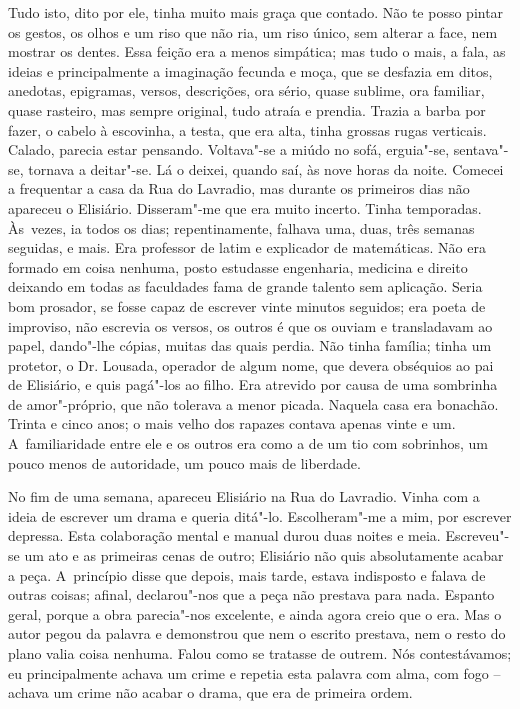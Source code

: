 Tudo isto, dito por ele, tinha muito mais graça que contado. Não te
posso pintar os gestos, os olhos e um riso que não ria, um riso único,
sem alterar a face, nem mostrar os dentes. Essa feição era a menos
simpática; mas tudo o mais, a fala, as ideias e principalmente a
imaginação fecunda e moça, que se desfazia em ditos, anedotas,
epigramas, versos, descrições, ora sério, quase sublime, ora familiar,
quase rasteiro, mas sempre original, tudo atraía e prendia. Trazia a
barba por fazer, o cabelo à escovinha, a testa, que era alta, tinha
grossas rugas verticais. Calado, parecia estar pensando. Voltava"-se a
miúdo no sofá, erguia"-se, sentava"-se, tornava a deitar"-se. Lá o deixei,
quando saí, às nove horas da noite. Comecei a frequentar a casa da Rua
do Lavradio, mas durante os primeiros dias não apareceu o Elisiário.
Disseram"-me que era muito incerto. Tinha temporadas. Às~vezes, ia todos
os dias; repentinamente, falhava uma, duas, três semanas seguidas, e
mais. Era professor de latim e explicador de matemáticas. Não era
formado em coisa nenhuma, posto estudasse engenharia, medicina e direito
deixando em todas as faculdades fama de grande talento sem aplicação.
Seria bom prosador, se fosse capaz de escrever vinte minutos seguidos;
era poeta de improviso, não escrevia os versos, os outros é que os
ouviam e transladavam ao papel, dando"-lhe cópias, muitas das quais
perdia. Não tinha família; tinha um protetor, o Dr. Lousada, operador de
algum nome, que devera obséquios ao pai de Elisiário, e quis pagá"-los ao
filho. Era atrevido por causa de uma sombrinha de amor"-próprio, que não
tolerava a menor picada. Naquela casa era bonachão. Trinta e cinco anos;
o mais velho dos rapazes contava apenas vinte e um. A~familiaridade
entre ele e os outros era como a de um tio com sobrinhos, um pouco menos
de autoridade, um pouco mais de liberdade.

No fim de uma semana, apareceu Elisiário na Rua do Lavradio. Vinha com a
ideia de escrever um drama e queria ditá"-lo. Escolheram"-me a mim, por
escrever depressa. Esta colaboração mental e manual durou duas noites e
meia. Escreveu"-se um ato e as primeiras cenas de outro; Elisiário não
quis absolutamente acabar a peça. A~princípio disse que depois, mais
tarde, estava indisposto e falava de outras coisas; afinal, declarou"-nos
que a peça não prestava para nada. Espanto geral, porque a obra
parecia"-nos excelente, e ainda agora creio que o era. Mas o autor pegou
da palavra e demonstrou que nem o escrito prestava, nem o resto do plano
valia coisa nenhuma. Falou como se tratasse de outrem. Nós
contestávamos; eu principalmente achava um crime e repetia esta palavra
com alma, com fogo -- achava um crime não acabar o drama, que era de
primeira ordem.

